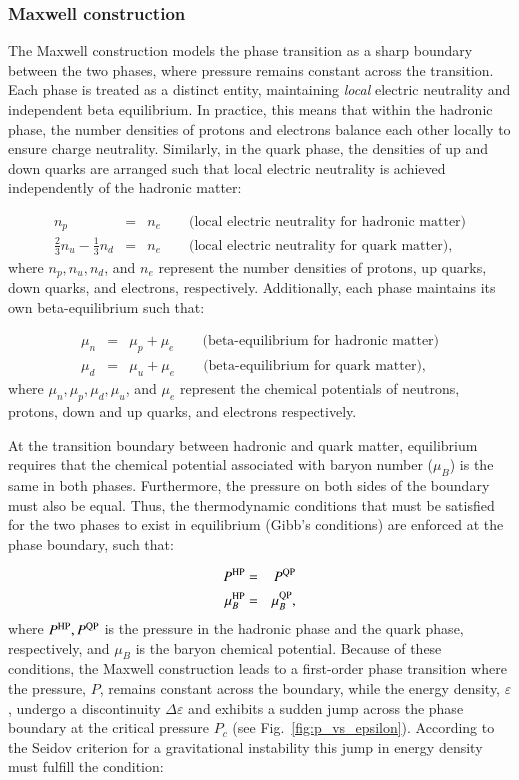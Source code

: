 \documentclass[main.tex]{subfiles}
\begin{document}
    \subsubsection{Maxwell construction}
    The Maxwell construction models the phase transition as a sharp boundary between the two phases, where pressure remains constant across the transition. Each phase is treated as a distinct entity, maintaining \textit{local} electric neutrality and independent beta equilibrium. In practice, this means that within the hadronic phase, the number densities of protons and electrons balance each other locally to ensure charge neutrality. Similarly, in the quark phase, the densities of up and down quarks are arranged such that local electric neutrality is achieved independently of the hadronic matter:

    \begin{eqnarray}
        n_p &=& n_e\qquad \textrm{(local electric neutrality for hadronic matter)} \\
        \frac{2}{3}n_u - \frac{1}{3}n_d &=& n_e\qquad \textrm{(local electric neutrality for quark matter)},
    \end{eqnarray}
    where $n_p, n_u, n_d$, and $n_e$ represent the number densities of protons, up quarks, down quarks, and electrons, respectively. Additionally, each phase maintains its own beta-equilibrium such that:

    \begin{eqnarray}
        \mu_n &=& \mu_p + \mu_e\qquad \textrm{(beta-equilibrium for hadronic matter)} \\
        \mu_d &=& \mu_u + \mu_e\qquad \textrm{(beta-equilibrium for quark matter)},
    \end{eqnarray}
    where $\mu_n, \mu_p, \mu_d, \mu_u$, and $\mu_e$ represent the chemical potentials of neutrons, protons, down and up quarks, and electrons respectively.

    At the transition boundary between hadronic and quark matter, equilibrium requires that the chemical potential associated with baryon number ($\mu_B$) is the same in both phases. Furthermore, the pressure on both sides of the boundary must also be equal. Thus, the thermodynamic conditions that must be satisfied for the two phases to exist in equilibrium (Gibb's conditions) are enforced at the phase boundary, such that:

    \begin{eqnarray}
        P^{\rm HP} &=& P^{\rm QP} \\
        \mu^{\rm HP}_B &=& \mu^{\rm QP}_B,
    \end{eqnarray}
    where $P^{\rm HP}, P^{\rm QP}$ is the pressure in the hadronic phase and the quark phase, respectively, and $\mu_B$ is the baryon chemical potential. Because of these conditions, the Maxwell construction leads to a first-order phase transition where the pressure, $P$, remains constant across the boundary, while the energy density, $\varepsilon$, undergo a discontinuity $\Delta \varepsilon$ and exhibits a sudden jump across the phase boundary at the critical pressure $P_c$ (see Fig.~\ref{fig:p_vs_epsilon}). According to the Seidov criterion \citep{Seidov:1971sas} for a gravitational instability this jump in energy density must fulfill the condition:
    
\end{document}

